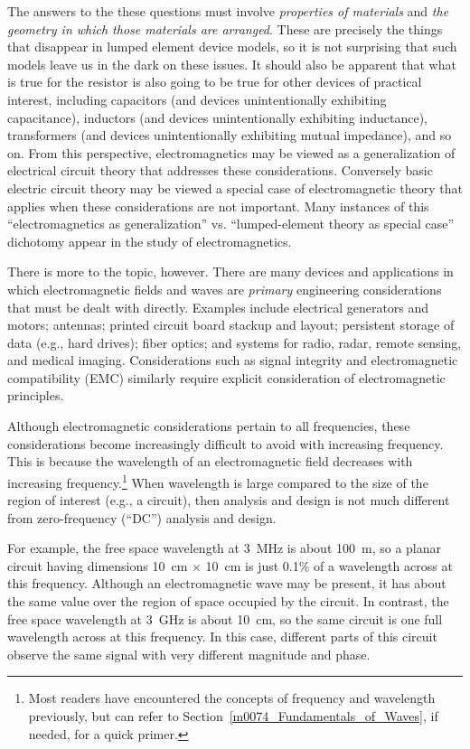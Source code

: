 The answers to the these questions must involve \emph{properties of materials} and \emph{the geometry in which those materials are arranged}.  These are precisely the things that disappear in lumped element device models, so it is not surprising that such models leave us in the dark on these issues.
It should also be apparent that what is true for the resistor is also going to be true for other devices of practical interest, including 
capacitors (and devices unintentionally exhibiting capacitance),
inductors (and devices unintentionally exhibiting inductance),
transformers (and devices unintentionally exhibiting mutual impedance), 
and so on.
From this perspective, electromagnetics may be viewed as a generalization of electrical circuit theory that addresses these considerations.
Conversely basic electric circuit theory may be viewed a special case of electromagnetic theory that applies when these considerations are not important.
Many instances of this ``electromagnetics as generalization'' vs. ``lumped-element theory as special case'' dichotomy appear in the study of electromagnetics.

There is more to the topic, however.
There are many devices and applications in which electromagnetic fields and waves are \emph{primary} engineering considerations that must be dealt with directly.
Examples include electrical generators and motors; 
antennas; 
printed circuit board stackup and layout; 
persistent storage of data (e.g., hard drives);
fiber optics; and 
systems for radio, radar, remote sensing, and medical imaging. 
Considerations such as signal integrity and electromagnetic compatibility (EMC) similarly require explicit consideration of electromagnetic principles.

Although electromagnetic considerations pertain to all frequencies, these considerations become increasingly difficult to avoid with increasing frequency.
This is because the wavelength 
of an electromagnetic field decreases with increasing frequency.\footnote{Most readers have encountered the concepts of frequency and wavelength previously, but can refer to Section~\ref{m0074_Fundamentals_of_Waves}, if needed, for a quick primer.}
When wavelength is large compared to the size of the region of interest (e.g., a circuit), then analysis and design is not much different from zero-frequency (``DC'') analysis and design.

For example, the free space wavelength at 3~MHz is about 100~m, so a planar circuit having dimensions 10~cm $\times$ 10~cm is just 0.1\% of a wavelength across at this frequency.
Although an electromagnetic wave may be present, it has about the same value over the region of space occupied by the circuit. 
In contrast, the free space wavelength at 3~GHz is about 10~cm, so the same circuit is one full wavelength across at this frequency.
In this case, different parts of this circuit observe the same signal with very different magnitude and phase. 

